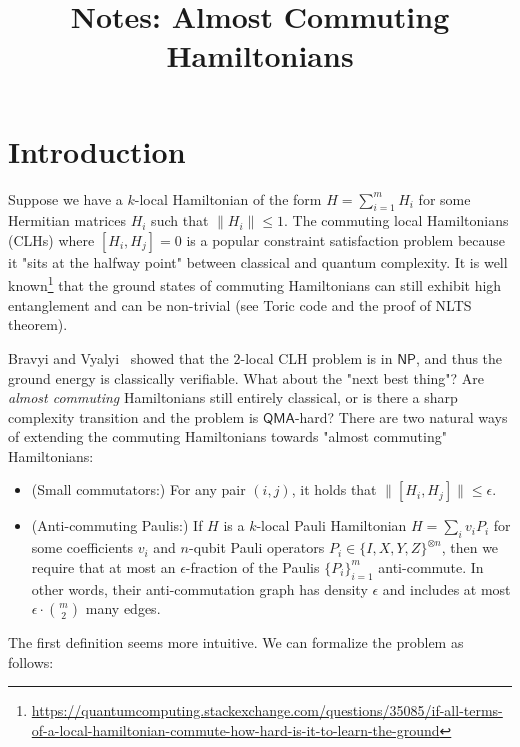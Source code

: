 \documentclass[12pt]{article}
\title{Notes: Almost Commuting Hamiltonians}
\author{ }
\date{}
\theoremstyle{plain}
\begin{document}
\maketitle



\section{Introduction}

Suppose we have a $k$-local Hamiltonian of the form $H = \sum_{i=1}^m H_i$
for some Hermitian matrices $H_i$ such that $\| H_i \| \leq 1$. The
commuting local Hamiltonians
(CLHs) where $[H_i,H_j]=0$ is a popular constraint satisfaction problem because it "sits at the halfway point" between classical and quantum complexity. It is well known\footnote{\url{https://quantumcomputing.stackexchange.com/questions/35085/if-all-terms-of-a-local-hamiltonian-commute-how-hard-is-it-to-learn-the-ground}} that the ground states of commuting Hamiltonians can still exhibit high
entanglement and can be non-trivial (see Toric code and the proof of NLTS theorem).

Bravyi and Vyalyi~\cite{bravyi2004commutativeversionklocalhamiltonian} showed that the $2$-local CLH problem is in $\mathsf{NP}$, and thus the ground
energy is classically verifiable. What about the "next best thing"? Are \emph{almost commuting} Hamiltonians still entirely classical, or is there a sharp complexity transition and the problem is $\mathsf{QMA}$-hard? There are two natural ways of extending the commuting Hamiltonians towards "almost commuting" Hamiltonians:
\begin{itemize}
    \item (Small commutators:) For any pair $(i,j)$, it holds that $\|[H_i,H_j]\| \leq \epsilon$.

    \item (Anti-commuting Paulis:) If $H$ is a $k$-local Pauli Hamiltonian $H=\sum_i v_i P_i$ for some coefficients $v_i$ and $n$-qubit Pauli operators $P_i \in \{I,X,Y,Z\}^{\otimes n}$, then we require that at most an $\epsilon$-fraction of the Paulis $\{P_i\}_{i=1}^m$ anti-commute. In other words, their anti-commutation graph has density $\epsilon$ and includes at most $\epsilon \cdot \binom{m}{2}$ many edges.
\end{itemize}

The first definition seems more intuitive. We can formalize the problem as follows:
\end{document}
